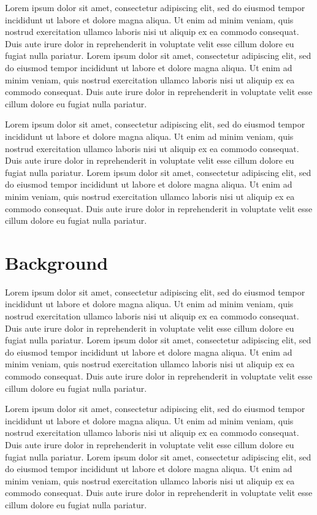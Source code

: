 \documentclass[11pt]{report}
\begin{document}
Lorem ipsum dolor sit amet, consectetur adipiscing elit, sed do eiusmod tempor incididunt ut labore et dolore magna aliqua. Ut enim ad minim veniam, quis nostrud exercitation ullamco laboris nisi ut aliquip ex ea commodo consequat. Duis aute irure dolor in reprehenderit in voluptate velit esse cillum dolore eu fugiat nulla pariatur. Lorem ipsum dolor sit amet, consectetur adipiscing elit, sed do eiusmod tempor incididunt ut labore et dolore magna aliqua. Ut enim ad minim veniam, quis nostrud exercitation ullamco laboris nisi ut aliquip ex ea commodo consequat. Duis aute irure dolor in reprehenderit in voluptate velit esse cillum dolore eu fugiat nulla pariatur.

Lorem ipsum dolor sit amet, consectetur adipiscing elit, sed do eiusmod tempor incididunt ut labore et dolore magna aliqua. Ut enim ad minim veniam, quis nostrud exercitation ullamco laboris nisi ut aliquip ex ea commodo consequat. Duis aute irure dolor in reprehenderit in voluptate velit esse cillum dolore eu fugiat nulla pariatur. Lorem ipsum dolor sit amet, consectetur adipiscing elit, sed do eiusmod tempor incididunt ut labore et dolore magna aliqua. Ut enim ad minim veniam, quis nostrud exercitation ullamco laboris nisi ut aliquip ex ea commodo consequat. Duis aute irure dolor in reprehenderit in voluptate velit esse cillum dolore eu fugiat nulla pariatur.

\section{Background}
Lorem ipsum dolor sit amet, consectetur adipiscing elit, sed do eiusmod tempor incididunt ut labore et dolore magna aliqua. Ut enim ad minim veniam, quis nostrud exercitation ullamco laboris nisi ut aliquip ex ea commodo consequat. Duis aute irure dolor in reprehenderit in voluptate velit esse cillum dolore eu fugiat nulla pariatur. Lorem ipsum dolor sit amet, consectetur adipiscing elit, sed do eiusmod tempor incididunt ut labore et dolore magna aliqua. Ut enim ad minim veniam, quis nostrud exercitation ullamco laboris nisi ut aliquip ex ea commodo consequat. Duis aute irure dolor in reprehenderit in voluptate velit esse cillum dolore eu fugiat nulla pariatur.

Lorem ipsum dolor sit amet, consectetur adipiscing elit, sed do eiusmod tempor incididunt ut labore et dolore magna aliqua. Ut enim ad minim veniam, quis nostrud exercitation ullamco laboris nisi ut aliquip ex ea commodo consequat. Duis aute irure dolor in reprehenderit in voluptate velit esse cillum dolore eu fugiat nulla pariatur. Lorem ipsum dolor sit amet, consectetur adipiscing elit, sed do eiusmod tempor incididunt ut labore et dolore magna aliqua. Ut enim ad minim veniam, quis nostrud exercitation ullamco laboris nisi ut aliquip ex ea commodo consequat. Duis aute irure dolor in reprehenderit in voluptate velit esse cillum dolore eu fugiat nulla pariatur.
\end{document}
